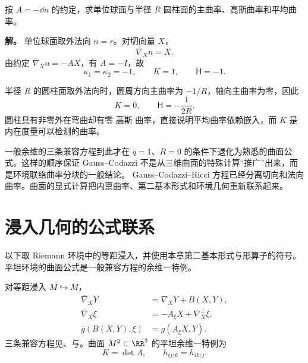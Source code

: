 \begin{exbox}[单位球面与圆柱面]
按 $A=-\dd n$ 的约定，求单位球面与半径 $R$ 圆柱面的主曲率、高斯曲率和平均曲率。

\textbf{解。} 单位球面取外法向 $n=r$。对切向量 $X$，
\[
\overline\nabla_Xn=X.
\]
由约定 $\overline\nabla_Xn=-AX$，有 $A=-I$，故
\[
\kappa_1=\kappa_2=-1,
\qquad
K=1,
\qquad
\mathsf H=-1.
\]

半径 $R$ 的圆柱面取外法向时，圆周方向主曲率为 $-1/R$，轴向主曲率为零，因此
\[
K=0,
\qquad
\mathsf H=-\frac{1}{2R}.
\]
圆柱具有非零外在弯曲却有零 高斯 曲率，直接说明平均曲率依赖嵌入，而 $K$ 是内在度量可以检测的曲率。
\end{exbox}

一般余维的三条兼容方程到此才在 $q=1$、$\overline R=0$ 的条件下退化为熟悉的曲面公式。这样的顺序保证 Gauss--Codazzi 不是从三维曲面的特殊计算“推广”出来，而是环境联络曲率分块的一般结论。
Gauss--Codazzi--Ricci 方程已经分离切向和法向曲率。曲面的显式计算把内禀曲率、第二基本形式和环境几何重新联系起来。






\section{浸入几何的公式联系}
以下取 Riemann 环境中的等距浸入，并使用本章第二基本形式与形算子的符号。平坦环境的曲面公式是一般兼容方程的余维一特例。
\begin{note}[公式之间的联系]
对等距浸入 \(M\hookrightarrow\overline M\)，
\begin{align*}
\overline\nabla_XY&=\nabla_XY+B(X,Y),\\
\overline\nabla_X\xi&=-A_\xi X+\nabla_X^\perp\xi,\\
\overline g(B(X,Y),\xi)&=g(A_\xi X,Y).
\end{align*}
三条兼容方程见、与。曲面 \(M^2\subset\RR^3\) 的平坦余维一特例为
\[
K=\det A,
\qquad
h_{ij;k}=h_{ik;j}.
\]
\end{note}


